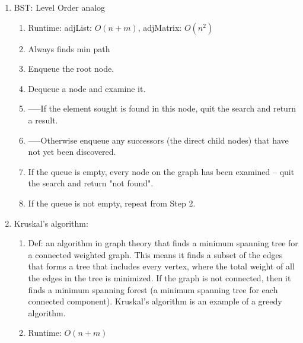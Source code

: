 \documentclass[12pt]{article}
\renewcommand{\=}[1]{\stackrel{#1}{=}} %
\theoremstyle{definition}
\theoremstyle{remark}
\begin{document}
\begin{enumerate}
\begin{enumerate}
\begin{enumerate}
      \item BST: Level Order analog
        \begin{enumerate}
        \item Runtime: adjList: $O(n+m)$, adjMatrix: $O(n^2)$
        \item Always finds min path
        \item Enqueue the root node.
        \item Dequeue a node and examine it.
        \item -----If the element sought is found in this node, quit the search and return a result.
        \item -----Otherwise enqueue any successors (the direct child nodes) that have not yet been discovered.
        \item If the queue is empty, every node on the graph has been examined – quit the search and return "not found".
        \item If the queue is not empty, repeat from Step 2.
        \end{enumerate}

      \item Kruskal's algorithm:
        \begin{enumerate}
        \item Def: an algorithm in graph theory that finds a minimum spanning tree for a connected weighted graph. This means it finds a subset of the edges that forms a tree that includes every vertex, where the total weight of all the edges in the tree is minimized. If the graph is not connected, then it finds a minimum spanning forest (a minimum spanning tree for each connected component). Kruskal's algorithm is an example of a greedy algorithm.
        \item Runtime: $O(n+m)$
        \end{enumerate}


\end{enumerate}
\end{enumerate}
\end{enumerate}
\end{document}
